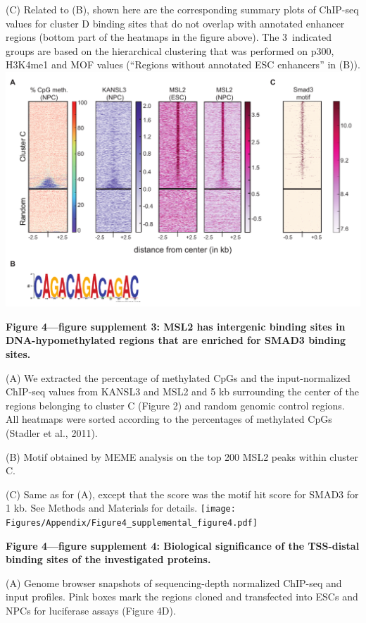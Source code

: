 \begin{footnotesize}
\begin{sffamily}
\begin{singlespacing}
(C) Related to (B), shown here are the corresponding summary plots of ChIP-seq values for cluster D binding sites that do not overlap with annotated enhancer regions (bottom part of the heatmaps in the figure above). The 3~indicated groups are based on the hierarchical clustering that was performed on p300, H3K4me1 and MOF values (``Regions without annotated ESC enhancers'' in (B)).
\newpage
\includegraphics[width=\textwidth]{Figures/Appendix/Figure4_supplemental_figure3_scissored.pdf}

\textbf{Figure 4—figure supplement 3: MSL2 has intergenic binding sites in DNA-hypomethylated regions that are enriched for SMAD3 binding sites.}

(A) We extracted the percentage of methylated CpGs and the input-normalized ChIP-seq values from KANSL3 and MSL2 and 5 kb surrounding the center of the regions belonging to cluster C (Figure 2) and random genomic control regions. All heatmaps were sorted according to the percentages of methylated CpGs (Stadler et al., 2011).

(B) Motif obtained by MEME analysis on the top 200 MSL2 peaks within cluster C.

(C) Same as for (A), except that the score was the motif hit score for SMAD3 for 1 kb. See Methods and Materials for details.
\newpage
\texttt{[image: Figures/Appendix/Figure4\_supplemental\_figure4.pdf]}

\textbf{Figure 4—figure supplement 4: Biological significance of the TSS-distal binding sites of the investigated proteins.}
\newpage

(A) Genome browser snapshots of sequencing-depth normalized ChIP-seq and input profiles. Pink boxes mark the regions cloned and transfected into ESCs and NPCs for luciferase assays (Figure 4D).


\end{singlespacing}
\end{sffamily}
\end{footnotesize}
